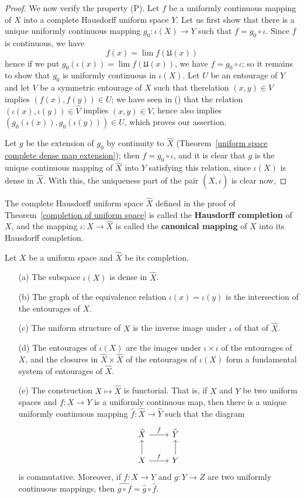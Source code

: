 \begin{proof}
We now verify the property (P). Let $f$ be a uniformly continuous mapping of $X$ into a complete Hausdorff uniform space $Y$. Let us first show that there is a unique uniformly continuous mapping $g_0:\iota(X)\to Y$ such that $f=g_0\circ\iota$. Since $f$ is continuous, we have
\[f(x)=\lim f(\mathfrak{U}(x))\]
hence if we put $g_0(\iota(x))=\lim f(\mathfrak{U}(x))$, we have $f=g_0\circ\iota$; so it remains to show that $g_0$ is uniformly continuous in $\iota(X)$. Let $U$ be an entourage of $Y$ and let $V$ be a symmetric entourage of $X$ such that therelation $(x,y)\in V$ implies $(f(x),f(y))\in U$; we have seen in () that the relation $(\iota(x),\iota(y))\in\widehat{V}$ implies $(x,y)\in V$, hence also implies $(g_0(\iota(x)),g_0(\iota(y)))\in U$, which proves our assertion.\par
Let $g$ be the extension of $g_0$ by continuity to $\widehat{X}$ (Theorem~\ref{uniform space complete dense map extension}); then $f=g_0\circ\iota$, and it is clear that $g$ is the unique continuous mapping of $\widehat{X}$ into $Y$ satisfying this relation, since $\iota(X)$ is dense in $\widehat{X}$. With this, the uniqueness part of the pair $(\widehat{X},\iota)$ is clear now,
\end{proof}
\begin{definition}
The complete Hausdorff uniform space $\widehat{X}$ defined in the proof of Theorem~\ref{completion of uniform space} is called the \textbf{Hausdorff completion} of $X$, and the mapping $\iota:X\to\widehat{X}$ is called the \textbf{canonical mapping} of $X$ into its Hausdorff completion.
\end{definition}
\begin{proposition}\label{uniform space completion prop}
Let $X$ be a uniform space and $\widehat{X}$ be its completion.
\begin{itemize}
\item[(a)] The subspace $\iota(X)$ is dense in $\widehat{X}$.
\item[(b)] The graph of the equivalence relation $\iota(x)=\iota(y)$ is the intersection of the entourages of $X$.
\item[(c)] The uniform structure of $X$ is the inverse image under $\iota$ of that of $\widehat{X}$.
\item[(d)] The entourages of $\iota(X)$ are the images under $\iota\times\iota$ of the entourages of $X$, and the closures in $\widehat{X}\times\widehat{X}$ of the entourages of $\iota(X)$ form a fundamental system of entourages of $\widehat{X}$.
\item[(e)] The construction $X\mapsto\widehat{X}$ is functorial. That is, if $X$ and $Y$ be two uniform spaces and $f:X\to Y$ is a uniformly continuous map, then there is a unique uniformly continuous mapping $\hat{f}:\widehat{X}\to\widehat{Y}$ such that the diagram
\[\begin{tikzcd}
\widehat{X}\ar[r,"\hat{f}"]&\widehat{Y}\\
X\ar[u]\ar[r,"f"]&Y\ar[u]
\end{tikzcd}\]
is commutative. Moreover, if $f:X\to Y$ and $g:Y\to Z$ are two uniformly continuous mappings, then $\widehat{g\circ f}=\hat{g}\circ\hat{f}$.
\end{itemize}
\end{proposition}
